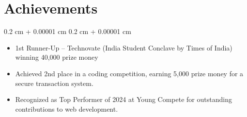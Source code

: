 \documentclass[10pt, letterpaper]{article}
\newenvironment{highlights}{
    \begin{itemize}[
        topsep=0.10 cm,
        parsep=0.10 cm,
        partopsep=0pt,
        itemsep=0pt,
        leftmargin=0.4 cm + 10pt
    ]
}{
    \end{itemize}
} %
\newenvironment{onecolentry}{
    \begin{adjustwidth}{
        0.2 cm + 0.00001 cm
    }{
        0.2 cm + 0.00001 cm
    }
}{
    \end{adjustwidth}
} %
\begin{document}
    \section{Achievements}
    \begin{onecolentry}
        \begin{highlights}
            \item 1st Runner-Up – Technovate (India Student Conclave by Times of India) winning 40,000 prize money 
            \item Achieved 2nd place in a coding competition, earning 5,000 prize money for a secure transaction system.
            \item Recognized as Top Performer of 2024 at Young Compete for outstanding contributions to web development.
        \end{highlights}
    \end{onecolentry}
\end{document}
